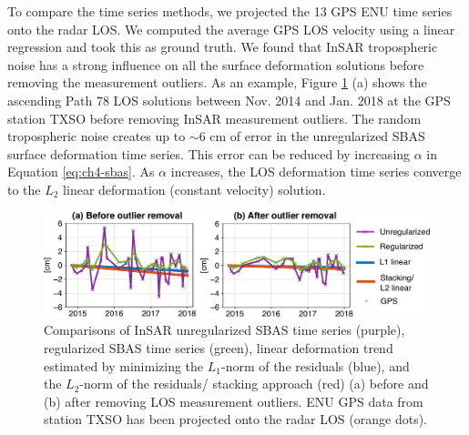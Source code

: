 
To compare the time series methods, we projected the 13 GPS ENU time series onto the radar LOS. We computed the average GPS LOS velocity using a linear regression and took this as ground truth. 
We found that InSAR tropospheric noise has a strong influence on all the surface deformation solutions before removing the measurement outliers. As an example, Figure \ref{fig:ch4-compare-ts} (a) shows the ascending Path 78 LOS solutions between Nov. 2014 and Jan. 2018 at the GPS station TXSO before removing InSAR measurement outliers. The random tropospheric noise creates up to $\sim$6 cm of error in the unregularized SBAS surface deformation time series. This error can be reduced by increasing $ \alpha$ in Equation \eqref{eq:ch4-sbas}. As $\alpha$ increases, the LOS deformation time series converge to the $L_2$ linear deformation (constant velocity) solution. 



\begin{figure}
	\centering
	\includegraphics[width=\textwidth]{figures/chapter4-grl/supplement/figureS5-compare-insar-2panel.pdf}
	\caption[Comparisons of InSAR SBAS solutions]{Comparisons of InSAR unregularized SBAS time series (purple), regularized SBAS time series (green), linear deformation trend estimated by minimizing the $L_1$-norm of the residuals (blue), and the $L_2$-norm of the residuals/ stacking approach (red)  (a) before and (b) after removing LOS measurement outliers. ENU GPS data from station TXSO has been projected onto the radar LOS (orange dots).}
	\label{fig:ch4-compare-ts}
\end{figure}

